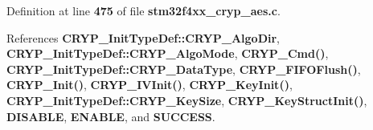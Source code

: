 Definition at line \textbf{ 475} of file \textbf{ stm32f4xx\+\_\+cryp\+\_\+aes.\+c}.



References \textbf{ C\+R\+Y\+P\+\_\+\+Init\+Type\+Def\+::\+C\+R\+Y\+P\+\_\+\+Algo\+Dir}, \textbf{ C\+R\+Y\+P\+\_\+\+Init\+Type\+Def\+::\+C\+R\+Y\+P\+\_\+\+Algo\+Mode}, \textbf{ C\+R\+Y\+P\+\_\+\+Cmd()}, \textbf{ C\+R\+Y\+P\+\_\+\+Init\+Type\+Def\+::\+C\+R\+Y\+P\+\_\+\+Data\+Type}, \textbf{ C\+R\+Y\+P\+\_\+\+F\+I\+F\+O\+Flush()}, \textbf{ C\+R\+Y\+P\+\_\+\+Init()}, \textbf{ C\+R\+Y\+P\+\_\+\+I\+V\+Init()}, \textbf{ C\+R\+Y\+P\+\_\+\+Key\+Init()}, \textbf{ C\+R\+Y\+P\+\_\+\+Init\+Type\+Def\+::\+C\+R\+Y\+P\+\_\+\+Key\+Size}, \textbf{ C\+R\+Y\+P\+\_\+\+Key\+Struct\+Init()}, \textbf{ D\+I\+S\+A\+B\+LE}, \textbf{ E\+N\+A\+B\+LE}, and \textbf{ S\+U\+C\+C\+E\+SS}.


